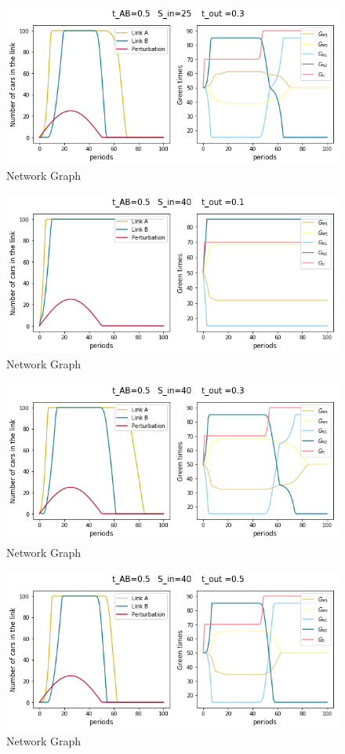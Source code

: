 \documentclass[11pt]{article}
\begin{document}
\begin{figure}[hbt!]
    \caption{Network Graph}
      \centering
	\includegraphics[width=12cm]{sim2}
\end{figure}

\begin{figure}[hbt!]
    \caption{Network Graph}
      \centering
	\includegraphics[width=12cm]{sim3}
\end{figure}

\begin{figure}[hbt!]
    \caption{Network Graph}
      \centering
	\includegraphics[width=12cm]{sim4}
\end{figure}

\begin{figure}[hbt!]
    \caption{Network Graph}
      \centering
	\includegraphics[width=12cm]{sim5}
\end{figure}
\end{document}
